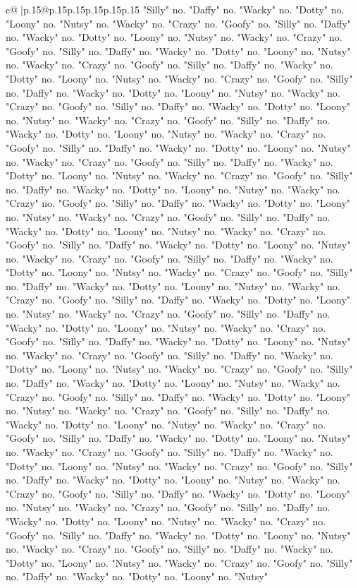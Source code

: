 \documentclass{article}
\begin{document}
{\begin{supertabular}{c@{$\;$}|p{.15\linewidth}@{}p{.15\linewidth}p{.15\linewidth}p{.15\linewidth}p{.15\linewidth}p{.15\linewidth}}
{{{"Silly" no. "Daffy" no. "Wacky" no. "Dotty" no. "Loony" no. "Nutsy" no. "Wacky" no. "Crazy" no. "Goofy" no. "Silly" no. "Daffy" no. "Wacky" no. "Dotty" no. "Loony" no. "Nutsy" no. "Wacky" no. "Crazy" no. "Goofy" no. "Silly" no. "Daffy" no. "Wacky" no. "Dotty" no. "Loony" no. "Nutsy" no. "Wacky" no. "Crazy" no. "Goofy" no. "Silly" no. "Daffy" no. "Wacky" no. "Dotty" no. "Loony" no. "Nutsy" no. "Wacky" no. "Crazy" no. "Goofy" no. "Silly" no. "Daffy" no. "Wacky" no. "Dotty" no. "Loony" no. "Nutsy" no. "Wacky" no. "Crazy" no. "Goofy" no. "Silly" no. "Daffy" no. "Wacky" no. "Dotty" no. "Loony" no. "Nutsy" no. "Wacky" no. "Crazy" no. "Goofy" no. "Silly" no. "Daffy" no. "Wacky" no. "Dotty" no. "Loony" no. "Nutsy" no. "Wacky" no. "Crazy" no. "Goofy" no. "Silly" no. "Daffy" no. "Wacky" no. "Dotty" no. "Loony" no. "Nutsy" no. "Wacky" no. "Crazy" no. "Goofy" no. "Silly" no. "Daffy" no. "Wacky" no. "Dotty" no. "Loony" no. "Nutsy" no. "Wacky" no. "Crazy" no. "Goofy" no. "Silly" no. "Daffy" no. "Wacky" no. "Dotty" no. "Loony" no. "Nutsy" no. "Wacky" no. "Crazy" no. "Goofy" no. "Silly" no. "Daffy" no. "Wacky" no. "Dotty" no. "Loony" no. "Nutsy" no. "Wacky" no. "Crazy" no. "Goofy" no. "Silly" no. "Daffy" no. "Wacky" no. "Dotty" no. "Loony" no. "Nutsy" no. "Wacky" no. "Crazy" no. "Goofy" no. "Silly" no. "Daffy" no. "Wacky" no. "Dotty" no. "Loony" no. "Nutsy" no. "Wacky" no. "Crazy" no. "Goofy" no. "Silly" no. "Daffy" no. "Wacky" no. "Dotty" no. "Loony" no. "Nutsy" no. "Wacky" no. "Crazy" no. "Goofy" no. "Silly" no. "Daffy" no. "Wacky" no. "Dotty" no. "Loony" no. "Nutsy" no. "Wacky" no. "Crazy" no. "Goofy" no. "Silly" no. "Daffy" no. "Wacky" no. "Dotty" no. "Loony" no. "Nutsy" no. "Wacky" no. "Crazy" no. "Goofy" no. "Silly" no. "Daffy" no. "Wacky" no. "Dotty" no. "Loony" no. "Nutsy" no. "Wacky" no. "Crazy" no. "Goofy" no. "Silly" no. "Daffy" no. "Wacky" no. "Dotty" no. "Loony" no. "Nutsy" no. "Wacky" no. "Crazy" no. "Goofy" no. "Silly" no. "Daffy" no. "Wacky" no. "Dotty" no. "Loony" no. "Nutsy" no. "Wacky" no. "Crazy" no. "Goofy" no. "Silly" no. "Daffy" no. "Wacky" no. "Dotty" no. "Loony" no. "Nutsy" no. "Wacky" no. "Crazy" no. "Goofy" no. "Silly" no. "Daffy" no. "Wacky" no. "Dotty" no. "Loony" no. "Nutsy" no. "Wacky" no. "Crazy" no. "Goofy" no. "Silly" no. "Daffy" no. "Wacky" no. "Dotty" no. "Loony" no. "Nutsy" no. "Wacky" no. "Crazy" no. "Goofy" no. "Silly" no. "Daffy" no. "Wacky" no. "Dotty" no. "Loony" no. "Nutsy" no. "Wacky" no. "Crazy" no. "Goofy" no. "Silly" no. "Daffy" no. "Wacky" no. "Dotty" no. "Loony" no. "Nutsy" no. "Wacky" no. "Crazy" no. "Goofy" no. "Silly" no. "Daffy" no. "Wacky" no. "Dotty" no. "Loony" no. "Nutsy" no. "Wacky" no. "Crazy" no. "Goofy" no. "Silly" no. "Daffy" no. "Wacky" no. "Dotty" no. "Loony" no. "Nutsy" no. "Wacky" no. "Crazy" no. "Goofy" no. "Silly" no. "Daffy" no. "Wacky" no. "Dotty" no. "Loony" no. "Nutsy" no. "Wacky" no. "Crazy" no. "Goofy" no. "Silly" no. "Daffy" no. "Wacky" no. "Dotty" no. "Loony" no. "Nutsy" no. "Wacky" no. "Crazy" no. "Goofy" no. "Silly" no. "Daffy" no. "Wacky" no. "Dotty" no. "Loony" no. "Nutsy" no. "Wacky" no. "Crazy" no. "Goofy" no. "Silly" no. "Daffy" no. "Wacky" no. "Dotty" no. "Loony" no. "Nutsy" }}}
\end{supertabular}}
\end{document}

